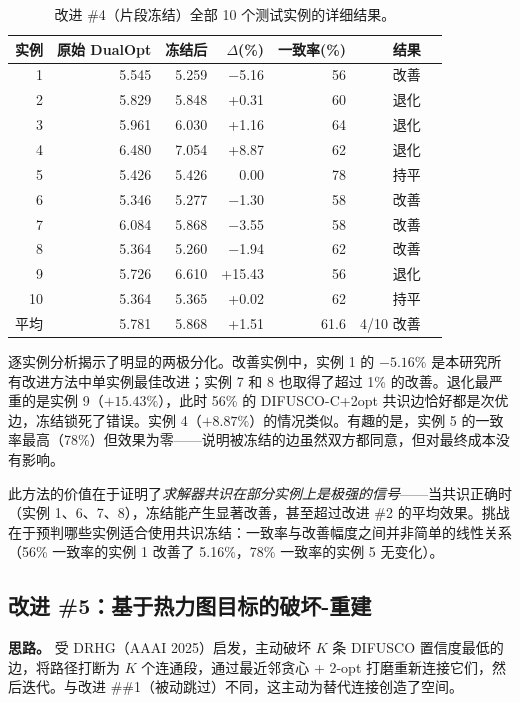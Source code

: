 \documentclass[11pt,a4paper]{ctexart}
\begin{document}
\begin{table}[H]
\centering
\small
\caption{改进 \#4（片段冻结）全部 10 个测试实例的详细结果。}
\label{tab:imp4_instances}
\begin{tabular}{@{}rrrrrrl@{}}
\toprule
实例 & 原始 DualOpt & 冻结后 & $\Delta$(\%) & 一致率(\%) & 结果 \\
\midrule
1 & 5.545 & 5.259 & $-$5.16 & 56 & 改善 \\
2 & 5.829 & 5.848 & +0.31 & 60 & 退化 \\
3 & 5.961 & 6.030 & +1.16 & 64 & 退化 \\
4 & 6.480 & 7.054 & +8.87 & 62 & 退化 \\
5 & 5.426 & 5.426 & 0.00 & 78 & 持平 \\
6 & 5.346 & 5.277 & $-$1.30 & 58 & 改善 \\
7 & 6.084 & 5.868 & $-$3.55 & 58 & 改善 \\
8 & 5.364 & 5.260 & $-$1.94 & 62 & 改善 \\
9 & 5.726 & 6.610 & +15.43 & 56 & 退化 \\
10 & 5.364 & 5.365 & +0.02 & 62 & 持平 \\
\midrule
平均 & 5.781 & 5.868 & +1.51 & 61.6 & 4/10 改善 \\
\bottomrule
\end{tabular}
\end{table}

逐实例分析揭示了明显的两极分化。改善实例中，实例 1 的 $-5.16\%$ 是本研究所有改进方法中单实例最佳改进；实例 7 和 8 也取得了超过 1\% 的改善。退化最严重的是实例 9（$+15.43\%$），此时 56\% 的 DIFUSCO-C+2opt 共识边恰好都是次优边，冻结锁死了错误。实例 4（$+8.87\%$）的情况类似。有趣的是，实例 5 的一致率最高（78\%）但效果为零——说明被冻结的边虽然双方都同意，但对最终成本没有影响。

此方法的价值在于证明了\textit{求解器共识在部分实例上是极强的信号}——当共识正确时（实例 1、6、7、8），冻结能产生显著改善，甚至超过改进 \#2 的平均效果。挑战在于预判哪些实例适合使用共识冻结：一致率与改善幅度之间并非简单的线性关系（56\% 一致率的实例 1 改善了 5.16\%，78\% 一致率的实例 5 无变化）。

\subsection{改进 \#5：基于热力图目标的破坏-重建}
\label{sec:imp5}

\textbf{思路。} 受 DRHG（AAAI 2025）启发，主动破坏 $K$ 条 DIFUSCO 置信度最低的边，将路径打断为 $K$ 个连通段，通过最近邻贪心 + 2-opt 打磨重新连接它们，然后迭代。与改进 \#\#1（被动跳过）不同，这主动为替代连接创造了空间。
\end{document}
